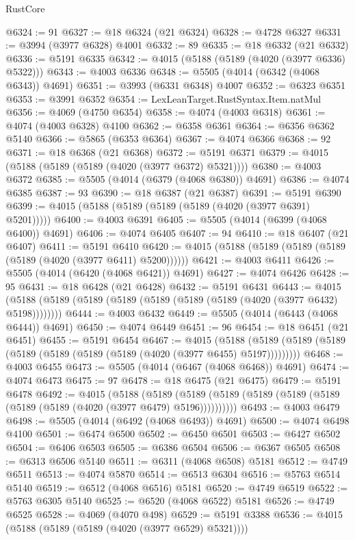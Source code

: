 \begin{lexlean}{RustCore}
\begin{coremodule}
@6324 := 91
@6327 := @18 @6324 (@21 @6324)
@6328 := @4728 @6327
@6331 := @3994 (@3977 @6328) @4001
@6332 := 89
@6335 := @18 @6332 (@21 @6332)
@6336 := @5191 @6335
@6342 := @4015 (@5188 (@5189 (@4020 (@3977 @6336) @5322)))
@6343 := @4003 @6336
@6348 := @5505 (@4014 (@6342 (@4068 @6343)) @4691)
@6351 := @3993 (@6331 @6348) @4007
@6352 := @6323 @6351
@6353 := @3991 @6352
@6354 := LexLeanTarget.RustSyntax.Item.natMul
@6356 := @4069 (@4750 @6354)
@6358 := @4074 (@4003 @6318)
@6361 := @4074 (@4003 @6328) @4100
@6362 := @6358 @6361
@6364 := @6356 @6362 @5140
@6366 := @5865 (@6353 @6364)
@6367 := @4074 @6366
@6368 := 92
@6371 := @18 @6368 (@21 @6368)
@6372 := @5191 @6371
@6379 := @4015 (@5188 (@5189 (@5189 (@4020 (@3977 @6372) @5321))))
@6380 := @4003 @6372
@6385 := @5505 (@4014 (@6379 (@4068 @6380)) @4691)
@6386 := @4074 @6385
@6387 := 93
@6390 := @18 @6387 (@21 @6387)
@6391 := @5191 @6390
@6399 := @4015 (@5188 (@5189 (@5189 (@5189 (@4020 (@3977 @6391) @5201)))))
@6400 := @4003 @6391
@6405 := @5505 (@4014 (@6399 (@4068 @6400)) @4691)
@6406 := @4074 @6405
@6407 := 94
@6410 := @18 @6407 (@21 @6407)
@6411 := @5191 @6410
@6420 := @4015 (@5188 (@5189 (@5189 (@5189 (@5189 (@4020 (@3977 @6411) @5200))))))
@6421 := @4003 @6411
@6426 := @5505 (@4014 (@6420 (@4068 @6421)) @4691)
@6427 := @4074 @6426
@6428 := 95
@6431 := @18 @6428 (@21 @6428)
@6432 := @5191 @6431
@6443 := @4015 (@5188 (@5189 (@5189 (@5189 (@5189 (@5189 (@5189 (@4020 (@3977 @6432) @5198))))))))
@6444 := @4003 @6432
@6449 := @5505 (@4014 (@6443 (@4068 @6444)) @4691)
@6450 := @4074 @6449
@6451 := 96
@6454 := @18 @6451 (@21 @6451)
@6455 := @5191 @6454
@6467 := @4015
    (@5188 (@5189 (@5189 (@5189 (@5189 (@5189 (@5189 (@5189 (@4020 (@3977 @6455) @5197)))))))))
@6468 := @4003 @6455
@6473 := @5505 (@4014 (@6467 (@4068 @6468)) @4691)
@6474 := @4074 @6473
@6475 := 97
@6478 := @18 @6475 (@21 @6475)
@6479 := @5191 @6478
@6492 := @4015
    (@5188
      (@5189 (@5189 (@5189 (@5189 (@5189 (@5189 (@5189 (@5189 (@4020 (@3977 @6479) @5196))))))))))
@6493 := @4003 @6479
@6498 := @5505 (@4014 (@6492 (@4068 @6493)) @4691)
@6500 := @4074 @6498 @4100
@6501 := @6474 @6500
@6502 := @6450 @6501
@6503 := @6427 @6502
@6504 := @6406 @6503
@6505 := @6386 @6504
@6506 := @6367 @6505
@6508 := @6313 @6506 @5140
@6511 := @6311 (@4068 @6508) @5181
@6512 := @4749 @6511
@6513 := @4074 @5870
@6514 := @6513 @6304
@6516 := @5763 @6514 @5140
@6519 := @6512 (@4068 @6516) @5181
@6520 := @4749 @6519
@6522 := @5763 @6305 @5140
@6525 := @6520 (@4068 @6522) @5181
@6526 := @4749 @6525
@6528 := @4069 (@4070 @498)
@6529 := @5191 @3388
@6536 := @4015 (@5188 (@5189 (@5189 (@4020 (@3977 @6529) @5321))))

\end{coremodule}
\end{lexlean}

